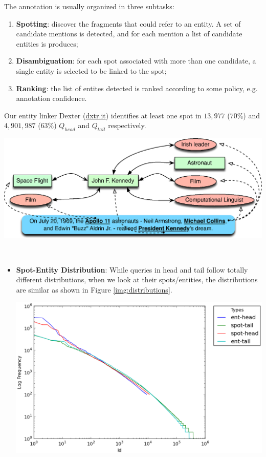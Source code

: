\documentclass[a0,portrait,final]{a0poster}
\newcommand{\tail}[1]{$Q_{tail}${}}
\newcommand{\head}[1]{$Q_{head}${}}
\newcommand{\pbox}[3]{
	\begin{center}
	\psshadowbox[linewidth=2mm,framearc=0.1,framesep=1em,shadowsize=4mm,shadowcolor=lightgray,linecolor=#2]{
		\begin{minipage}[t][][t]{#1}{
			#3 %
		}\end{minipage}
	}
	\end{center}
}
\newlength\ptitlespace
\newcommand{\ptitle}[1]{
	\vspace{\ptitlespace}
	\pbox{0.92\columnwidth}{arancioneisti}{
		\begin{center}
		\textsc{\LARGE\bluisti{#1}} %
		\end{center}
	}
	\vspace{0.5\ptitlespace}
}
\begin{document}
\begin{multicols}{2}
The annotation is usually organized in three subtasks:
\begin{enumerate}
	\item \textbf{Spotting}: discover the fragments that could refer to an entity. A set of candidate mentions is detected, and for each mention a list of candidate entities is produces;
	\item \textbf{Disambiguation}: for each spot associated with more than one candidate, a single entity is selected to be linked to the spot;
	\item \textbf{Ranking}: the list of entites detected is ranked according to some policy, e.g. annotation confidence. 
\end{enumerate}

Our entity linker Dexter (\url{dxtr.it}) identifies 
at least one spot in $13,977$ ($70\%$) and $4,901,987$ ($63\%$) \head{} and \tail{} 
respectively.

\vspace{5mm}
\begin{center}
\includegraphics[width=0.92\columnwidth]{img/annotation-example.eps}
\end{center}

\ptitle{Analysis}
\
\begin {itemize}

	\item {\textbf{Spot-Entity Distribution}:} While queries in head and tail follow totally different distributions, when we 		look at their spots/entities, the distributions are similar as shown in Figure \ref{img:distributions}.  
		\vspace{10mm}
		\begin{center}
		\includegraphics[width=0.6\columnwidth]{img/head-tail-ent-spot-dist.eps}
		\label{img:distributions}
		\end{center}


\end{itemize}
\end{multicols}
\end{document}
